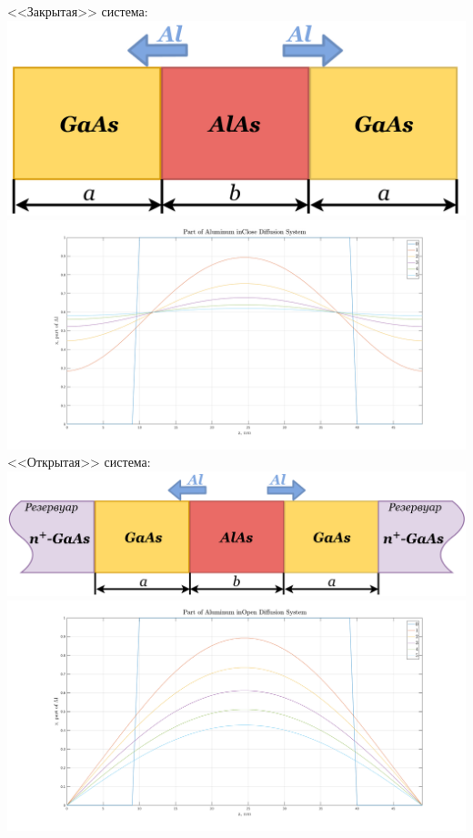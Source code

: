 \documentclass[10pt,pdf,hyperref={unicode},aspectratio={169}]{beamer}
\begin{document}
\begin{frame}
	\begin{columns}
	\centering
		{\color{red}<<Закрытая>> система:}\\
	   	\includegraphics[width=0.6\linewidth]{assets/DCloseBox}\\
	   	\includegraphics[width=\linewidth]{assets/DCAl}
	\centering
		{\color{red}<<Открытая>> система:}\\
	   	\includegraphics[width=\linewidth]{assets/DOpenBox}\\
	   	\includegraphics[width=\linewidth]{assets/DOAl}

	\end{columns}
\end{frame}
\end{document}
